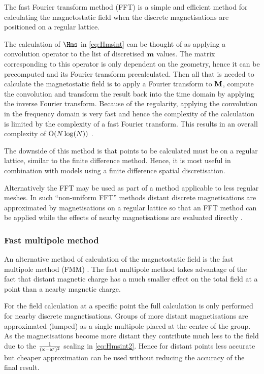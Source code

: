The fast Fourier transform method (FFT) is a simple and efficient method for calculating the magnetostatic field when the discrete magnetisations are positioned on a regular lattice.

The calculation of $\Hms$ in \cref{eq:Hmsint} can be thought of as applying a convolution operator to the list of discretised $\mathbf{m}$ values.
The matrix corresponding to this operator is only dependent on the geometry, hence it can be precomputed and its Fourier transform precalculated.
Then all that is needed to calculate the magnetostatic field is to apply a Fourier transform to $\mathbf{M}$, compute the convolution and transform the result back into the time domain by applying the inverse Fourier transform.
Because of the regularity, applying the convolution in the frequency domain is very fast and hence the complexity of the calculation is limited by the complexity of a fast Fourier transform.
This results in an overall complexity of $\text{O}{\left( N \log(N) \right)}$ \cite{Jones1997}.

The downside of this method is that points to be calculated must be on a regular lattice, similar to the finite difference method.
Hence, it is most useful in combination with models using a finite difference spatial discretisation.

Alternatively the FFT may be used as part of a method applicable to less regular meshes.
In such ``non-uniform FFT'' methods distant discrete magnetisations are approximated by magnetisations on a regular lattice so that an FFT method can be applied while the effects of nearby magnetisations are evaluated directly \cite{Jones1997}.


\subsubsection{Fast multipole method}
\label{sec:fast-mult-meth}

An alternative method of calculation of the magnetostatic field is the fast multipole method (FMM) \cite{Beatson1997}.
The fast multipole method takes advantage of the fact that distant magnetic charge has a much smaller effect on the total field at a point than a nearby magnetic charge.

For the field calculation at a specific point the full calculation is only performed for nearby discrete magnetisations.
Groups of more distant magnetisations are approximated (lumped) as a single multipole placed at the centre of the group.
As the magnetisations become more distant they contribute much less to the field due to the $\frac{1}{(\mathbf{x} - \mathbf{x}')^2}$ scaling in \cref{eq:Hmsint2}.
Hence for distant points less accurate but cheaper approximation can be used without reducing the accuracy of the final result.

